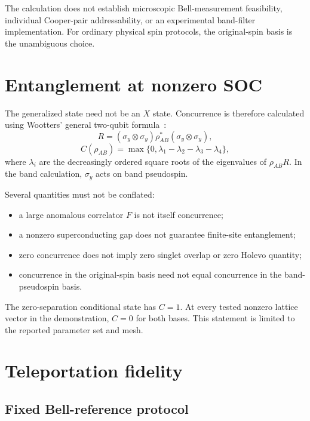 \documentclass[11pt]{article}
\begin{document}
The calculation does not establish microscopic Bell-measurement feasibility, individual Cooper-pair addressability, or an experimental band-filter implementation. For ordinary physical spin protocols, the original-spin basis is the unambiguous choice.

\section{Entanglement at nonzero SOC}
\label{sec:entanglement}

The generalized state need not be an $X$ state. Concurrence is therefore calculated using Wootters' general two-qubit formula~\cite{Wootters1998}:
\begin{equation}
R=(\sigma_y\otimes\sigma_y)\rho_{AB}^{*}(\sigma_y\otimes\sigma_y),
\end{equation}
\begin{equation}
C(\rho_{AB})=\max\{0,\lambda_1-\lambda_2-\lambda_3-\lambda_4\},
\label{eq:concurrence}
\end{equation}
where $\lambda_i$ are the decreasingly ordered square roots of the eigenvalues of $\rho_{AB}R$. In the band calculation, $\sigma_y$ acts on band pseudospin.

Several quantities must not be conflated:
\begin{itemize}
\item a large anomalous correlator $F$ is not itself concurrence;
\item a nonzero superconducting gap does not guarantee finite-site entanglement;
\item zero concurrence does not imply zero singlet overlap or zero Holevo quantity;
\item concurrence in the original-spin basis need not equal concurrence in the band-pseudospin basis.
\end{itemize}

The zero-separation conditional state has $C=1$. At every tested nonzero lattice vector in the demonstration, $C=0$ for both bases. This statement is limited to the reported parameter set and mesh.

\section{Teleportation fidelity}
\label{sec:teleportation}

\subsection{Fixed Bell-reference protocol}
\end{document}
